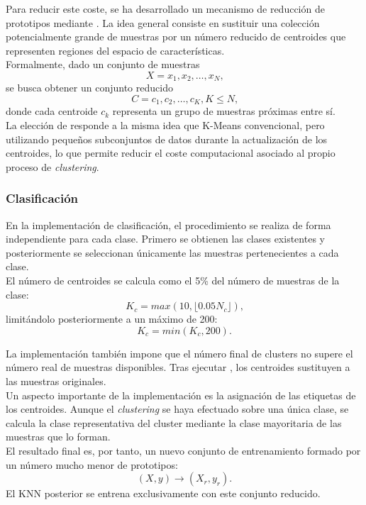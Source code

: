 \documentclass[a4paper,12pt,twoside,final]{book}
\begin{document}
Para reducir este coste, se ha desarrollado un mecanismo de reducción de prototipos mediante .
La idea general consiste en sustituir una colección potencialmente grande de muestras por un número reducido de
centroides que representen regiones del espacio de características.\\

Formalmente, dado un conjunto de muestras
\[
X = {x_1, x_2, \ldots, x_N}\text{,}
\]
se busca obtener un conjunto reducido
\[
C = {c_1, c_2, \ldots, c_K}, K \leq N\text{,}
\]
donde cada centroide $c_k$ representa un grupo de muestras próximas entre sí.\\

La elección de  responde a la misma idea que K-Means convencional, pero utilizando pequeños
subconjuntos de datos durante la actualización de los centroides, lo que permite reducir el coste computacional
asociado al propio proceso de \textit{clustering}.

\subsubsection{Clasificación}
En la implementación de clasificación, el procedimiento se realiza de forma independiente para cada clase. Primero se
obtienen las clases existentes y posteriormente se seleccionan únicamente las muestras pertenecientes a cada clase.\\

El número de centroides se calcula como el 5\% del número de muestras de la clase:
\[
K_c = max(10, \lfloor0.05N_c\rfloor)\text{,}
\]
limitándolo posteriormente a un máximo de 200:
\[
K_c = min(K_c, 200)\text{.}
\]

La implementación también impone que el número final de clusters no supere el número real de muestras disponibles. Tras
ejecutar , los centroides sustituyen a las muestras originales.\\

Un aspecto importante de la implementación es la asignación de las etiquetas de los centroides. Aunque el
\textit{clustering} se haya efectuado sobre una única clase, se calcula la clase representativa del cluster mediante la
clase mayoritaria de las muestras que lo forman.\\

El resultado final es, por tanto, un nuevo conjunto de entrenamiento formado por un número mucho menor de prototipos:
\[
(X,y)\rightarrow(X_r,y_r)\text{.}
\]
El KNN posterior se entrena exclusivamente con este conjunto reducido.
\end{document}
